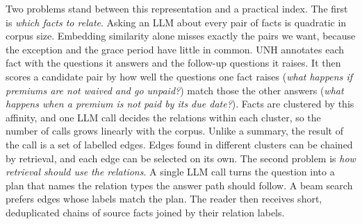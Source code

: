\documentclass[sigconf, review, anonymous]{acmart}
\newcommand{\sys}{UNH}
\begin{document}
Two problems stand between this representation and a practical index. The first is \emph{which facts to relate}. Asking an LLM about every pair of facts is quadratic in corpus size. Embedding similarity alone misses exactly the pairs we want, because the exception and the grace period have little in common. \sys{} annotates each fact with the questions it answers and the follow-up questions it raises. It then scores a candidate pair by how well the questions one fact raises (\emph{what happens if premiums are not waived and go unpaid?}) match those the other answers (\emph{what happens when a premium is not paid by its due date?}). Facts are clustered by this affinity, and one LLM call decides the relations within each cluster, so the number of calls grows linearly with the corpus. Unlike a summary, the result of the call is a set of labelled edges. Edges found in different clusters can be chained by retrieval, and each edge can be selected on its own. The second problem is \emph{how retrieval should use the relations}. A single LLM call turns the question into a plan that names the relation types the answer path should follow. A beam search prefers edges whose labels match the plan. The reader then receives short, deduplicated chains of source facts joined by their relation labels.
\end{document}
